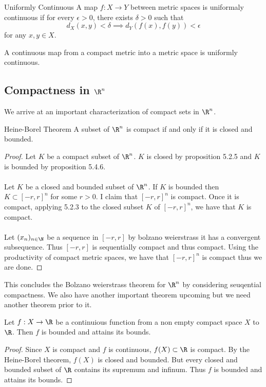 \begin{defn}{Uniformly Continuous}{} A map $f:X\to Y$ between metric spaces is uniformaly continuous if for every $\epsilon>0$, there exists $\delta>0$ such that $$d_X(x,y)<\delta\implies d_Y(f(x),f(y))<\epsilon$$ for any $x,y\in X$. 
\end{defn}

\begin{thm}{}{} A continuous map from a compact metric into a metric space is uniformly continuous. 
\end{thm}

\subsection{Compactness in $\R^n$}
We arrive at an important characterization of compact sets in $\R^n$. 
\begin{thm}{Heine-Borel Theorem}{} A subset of $\R^n$ is compact if and only if it is closed and bounded. \tcbline
\begin{proof}
Let $K$ be a compact subset of $\R^n$. $K$ is closed by proposition 5.2.5 and $K$ is bounded by proposition 5.4.6. \\~\\
Let $K$ be a closed and bounded subset of $\R^n$. If $K$ is bounded then $K\subset[-r,r]^n$ for some $r>0$. I claim that $[-r,r]^n$ is compact. Once it is compact, applying 5.2.3 to the closed subset $K$ of $[-r,r]^n$, we have that $K$ is compact. \\~\\
Let $(x_n)_{n\in\N}$ be a sequence in $[-r,r]$ by bolzano weierstrass it has a convergent subsequence. Thus $[-r,r]$ is sequentially compact and thus compact. Using the productivity of compact metric spaces, we have that $[-r,r]^n$ is compact thus we are done. 
\end{proof}
\end{thm}

This concludes the Bolzano weierstrass theorem for $\R^n$ by considering seuqential compactness. We also have another important theorem upcoming but we need another theorem prior to it. 

\begin{thm}{}{} Let $f:X\to\R$ be a continuious function from a non empty compact space $X$ to $\R$. Then $f$ is bounded and attains its bounds. \tcbline
\begin{proof}
Since $X$ is compact and $f$ is continuous, $f(X)\subset\R$ is compact. By the Heine-Borel theorem, $f(X)$ is closed and bounded. But every closed and bounded subset of $\R$ contains its supremum and infinum. Thus $f$ is bounded and attains its bounds. 
\end{proof}
\end{thm}

